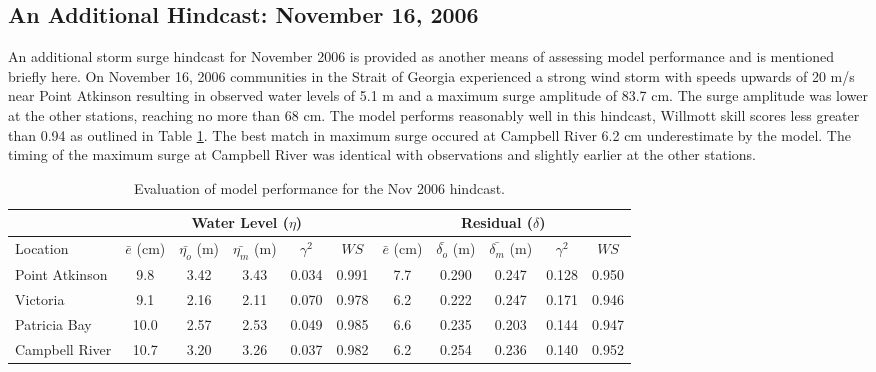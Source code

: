 \documentclass[pdftex,10pt]{article}
\begin{document}
\subsection{An Additional Hindcast: November 16, 2006}
An additional storm surge hindcast for November 2006 is provided as another means of assessing model performance and is mentioned briefly here. On November 16, 2006 communities in the Strait of Georgia experienced a strong wind storm with speeds upwards of 20 m/s near Point Atkinson resulting in observed water levels of 5.1 m and a maximum surge amplitude of 83.7 cm. The surge amplitude was lower at the other stations, reaching no more than 68 cm. The model performs reasonably well in this hindcast, Willmott skill scores less greater than 0.94 as outlined in Table \ref{tab:nov2006stat}.  The best match in maximum surge occured at Campbell River 6.2 cm underestimate by the model. The timing of the maximum surge at Campbell River was identical with observations and slightly earlier at the other stations. 

\begin{table}[h]
\centering 
\begin{tabular}{|l |c c c c c | c c c c c|} 
\hline 
& \multicolumn{5}{|c|}{Water Level ($\eta$)}        & \multicolumn{5}{|c|}{Residual ($\delta$)} \\ 
\hline 
Location       & $\bar{e}$ (cm) & $\bar{\eta_{o}}$ (m) & $\bar{\eta_{m}}$ (m) & $\gamma^2$ & $WS$   & $\bar{e}$ (cm) & $\bar{\delta_{o}}$ (m) & $\bar{\delta_{m}}$ (m) & $\gamma^2$ & $WS$ \\
\hline 
Point Atkinson &  9.8           &  3.42                & 3.43                 &   0.034    & 0.991  &  7.7           &  0.290                 & 0.247                  &  0.128     & 0.950 \\
Victoria       &  9.1           &  2.16                & 2.11                 &   0.070    & 0.978  &  6.2           &  0.222                 & 0.247                  &  0.171     & 0.946 \\
Patricia Bay   & 10.0           &  2.57                & 2.53                 &   0.049    & 0.985  &  6.6           &  0.235                 & 0.203                  &  0.144     & 0.947 \\
Campbell River & 10.7           &  3.20                & 3.26                 &   0.037    & 0.982  &  6.2           &  0.254                 & 0.236                  &  0.140     & 0.952 \\
\hline 
\end{tabular}
\caption{Evaluation of model performance for the Nov 2006 hindcast.}
\label{tab:nov2006stat} 
\end{table}
\end{document}
